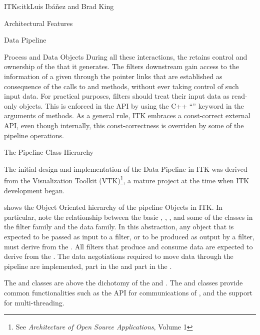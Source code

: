 \begin{aosachapter}{ITK}{s:itk}{Luis Ib\'{a}\~{n}ez and Brad King}
\begin{aosasect1}{Architectural Features}
\begin{aosasect2}{Data Pipeline}
\begin{aosasect3}{Process and Data Objects}
During all these interactions, the  retains
control and ownership of the  that it generates.
The filters downstream gain access to the information of a given
 through the pointer links that are established
as consequence of the calls to  and
 methods, without ever taking control of such
input data. For practical purposes, filters should treat their
input data as read-only objects. This is enforced in the API by
using the C++ ``'' keyword in the arguments of
 methods. As a general rule, ITK embraces a
const-correct external API, even though internally, this
const-correctness is overriden by some of the pipeline operations.


\end{aosasect3}

\begin{aosasect3}{The Pipeline Class Hierarchy}

The initial design and implementation of the Data Pipeline in ITK was derived
from the Visualization Toolkit (VTK)\footnote{See \emph{Architecture
of Open Source Applications}, Volume 1},  a mature project at the time
when ITK development began.

 shows the Object Oriented
hierarchy of the pipeline Objects in ITK. In particular, note the relationship
between the basic , , , and
some of the classes in the filter family and the data family. In this
abstraction, any object that is expected to be passed as input to a filter, or
to be produced as output by a filter, must derive from the . All
filters that produce and consume data are expected to derive from the
. The data negotiations required to move data through the
pipeline are implemented, part in the  and part in the
.


The  and  classes are above the
dichotomy of the  and . The
 and  classes provide common
functionalities such as the API for communications of ,
and the support for multi-threading.

\end{aosasect3}



\end{aosasect2}
\end{aosasect1}
\end{aosachapter}
